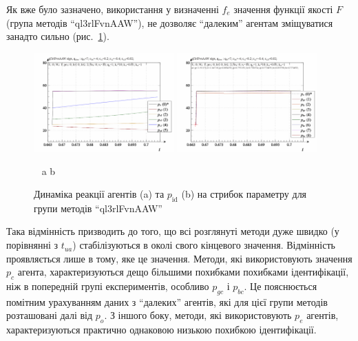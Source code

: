 Як вже було зазначено, використання у визначенні
$ f_e $ значення функції якості
$ F $ (група методів ``ql3rlFvnAAW''), не дозволяє ``далеким'' агентам
зміщуватися занадто сильно (рис.~\ref{atu:f:ql3rlFvnAAW_sign}).

\begin{figure}[htb!]
  \begin{center}
    \includegraphics[width=0.48\textwidth]{p/sign/qls-p_t_pi_m_ql3rlFvnAAW_sign.png}
    \hfill
    \includegraphics[width=0.48\textwidth]{p/sign/qls-p_t_p_m_ql3rlFvnAAW_sign.png}
  \end{center}
  \vspace{-1.0ex}
  \begin{center}
    ~ \hfill a \hfill\hfill b  \hfill ~
  \end{center}
  \vspace{-1.5ex}
  \caption{Динаміка реакції агентів (a) та $p_\mathrm{id}$ (b) на стрибок параметру для групи методів ``ql3rlFvnAAW''}
  \label{atu:f:ql3rlFvnAAW_sign}
\end{figure}

Така відмінність призводить до того, що всі розглянуті методи
дуже швидко (у порівнянні з $ t_{ua} $) стабілізуються в околі свого кінцевого
значення. Відмінність проявляється лише в тому, яке це
значення. Методи, які використовують значення
$ p_c $ агента, характеризуються дещо більшими похибками похибками
ідентифікації, ніж в попередній групі експериментів, особливо
$ p_{gc} $ і
$ p_{bc} $. Це пояснюється помітним урахуванням даних з ``далеких''
агентів, які для цієї групи методів розташовані далі від
$ p_o $. З іншого боку, методи, які використовують
$ p_e $ агентів, характеризуються практично однаковою низькою
похибкою ідентифікації.


